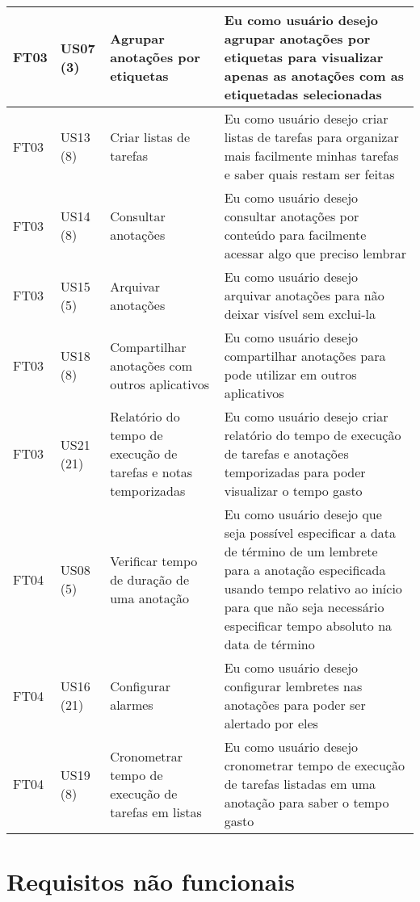 \documentclass[
	12pt,				%
	oneside,			%
	a4paper,			%
	english,			%
	brazil,				%
	]{abntex2}
\begin{document}
\begin{longtable}{@{}p{}p{}p{}p{}@{}}
FT03 & US07 (3) & Agrupar anotações por etiquetas & Eu como usuário desejo agrupar anotações por etiquetas para visualizar apenas as anotações com as etiquetadas selecionadas \\ \midrule
FT03 & US13 (8) & Criar listas de tarefas & Eu como usuário desejo criar listas de tarefas para organizar mais facilmente minhas tarefas e saber quais restam ser feitas \\ \midrule
FT03 & US14 (8) & Consultar anotações & Eu como usuário desejo consultar anotações por conteúdo para facilmente acessar algo que preciso lembrar \\ \midrule
FT03 & US15 (5) & Arquivar anotações & Eu como usuário desejo arquivar anotações para não deixar visível sem exclui-la \\ \midrule
FT03 & US18 (8) & Compartilhar anotações com outros aplicativos & Eu como usuário desejo compartilhar anotações para pode utilizar em outros aplicativos \\ \midrule
FT03 & US21 (21) & Relatório do tempo de execução de tarefas e notas temporizadas & Eu como usuário desejo criar relatório do tempo de execução de tarefas e anotações temporizadas para poder visualizar o tempo gasto \\ \midrule
FT04 & US08 (5) & Verificar tempo de duração de uma anotação & Eu como usuário desejo que seja possível especificar a data de término de um lembrete para a anotação especificada usando tempo relativo ao início para que não seja necessário especificar tempo absoluto na data de término \\ \midrule
FT04 & US16 (21) & Configurar alarmes & Eu como usuário desejo configurar lembretes nas anotações para poder ser alertado por eles \\ \midrule
FT04 & US19 (8) & Cronometrar tempo de execução de tarefas em listas & Eu como usuário desejo cronometrar tempo de execução de tarefas listadas em uma anotação para saber o tempo gasto \\ \bottomrule
\end{longtable}

\section{Requisitos não funcionais}
\begin{table}[ht]
\end{table}
\end{document}
